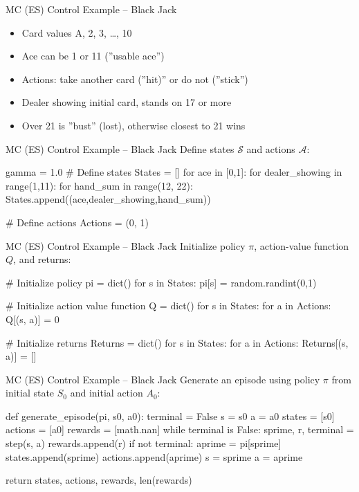 \documentclass[ignorenonframetext,xcolor=x11names]{beamer}
\begin{document}
\begin{frame}{MC (ES) Control Example -- Black Jack}
\begin{itemize}
   \item Card values A, 2, 3, \ldots, 10
   \item Ace can be 1 or 11 (''usable ace'')
   \item Actions: take another card (''hit)'' or do not (''stick'')
   \item Dealer showing initial card, stands on 17 or more
   \item Over 21 is ''bust'' (lost), otherwise closest to 21 wins
\end{itemize}
\end{frame}

\begin{frame}[fragile]{MC (ES) Control Example -- Black Jack}
Define states $\mathcal{S}$ and actions $\mathcal{A}$:
\begin{pythoncode}
gamma = 1.0
# Define states
States = []
for ace in [0,1]:
    for dealer_showing in range(1,11):
        for hand_sum in range(12, 22):
            States.append((ace,dealer_showing,hand_sum))

# Define actions
Actions = (0, 1)
\end{pythoncode}
\end{frame}

\begin{frame}[fragile]{MC (ES) Control Example -- Black Jack}
Initialize policy $\pi$, action-value function $Q$, and returns:
\begin{pythoncode}
# Initialize policy
pi = dict()
for s in States:
    pi[s] = random.randint(0,1)

# Initialize action value function
Q = dict()
for s in States:
    for a in Actions:
        Q[(s, a)] = 0

# Initialize returns
Returns = dict()
for s in States:
    for a in Actions:
        Returns[(s, a)] = []
\end{pythoncode}
\end{frame}


\begin{frame}[fragile]{MC (ES) Control Example -- Black Jack}
Generate an episode using policy $\pi$ from initial state $S_0$ and initial action $A_0$:
\begin{pythoncode}
def generate_episode(pi, s0, a0):
    terminal = False
    s = s0
    a = a0
    states = [s0]
    actions = [a0]
    rewards = [math.nan]
    while terminal is False:
        sprime, r, terminal = step(s, a)
        rewards.append(r)
        if not terminal:
            aprime = pi[sprime]
            states.append(sprime)
            actions.append(aprime)
            s = sprime
            a = aprime

    return states, actions, rewards, len(rewards)
\end{pythoncode}
\end{frame}
\end{document}
